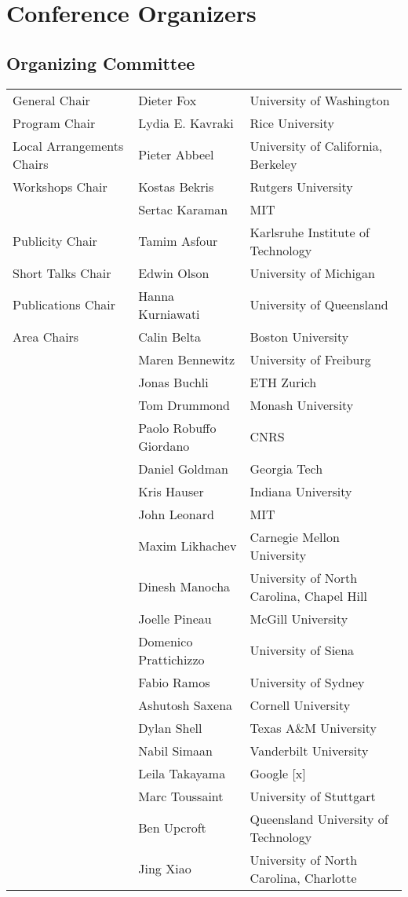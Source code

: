\chapter{Conference Organizers}

\vspace{-1.5cm}
\section{Organizing Committee}

\begin{tabular}{>{\raggedleft}p{5cm}p{4.5cm}>{\small}p{7cm}}
General Chair & Dieter Fox & University of Washington\\
Program Chair & Lydia E. Kavraki & Rice University\\
Local Arrangements Chairs & Pieter Abbeel & University of California, Berkeley\\
Workshops Chair & Kostas Bekris & Rutgers University\\
& Sertac Karaman & MIT\\
Publicity Chair & Tamim Asfour & Karlsruhe Institute of Technology\\
Short Talks Chair & Edwin Olson & University of Michigan\\
Publications Chair & Hanna Kurniawati & University of Queensland\\[5mm]

Area Chairs & Calin Belta & Boston University\\
& Maren Bennewitz & University of Freiburg\\
& Jonas Buchli & ETH Zurich\\
& Tom Drummond & Monash University\\
& Paolo Robuffo Giordano & CNRS \\
& Daniel Goldman & Georgia Tech \\
& Kris Hauser & Indiana University \\
& John Leonard & MIT \\
& Maxim Likhachev & Carnegie Mellon University \\
& Dinesh Manocha & University of North Carolina, Chapel Hill\\
& Joelle Pineau & McGill University \\
& Domenico Prattichizzo & University of Siena \\
& Fabio Ramos & University of Sydney \\
& Ashutosh Saxena & Cornell University \\
& Dylan Shell & Texas A\&M University \\
& Nabil Simaan & Vanderbilt University \\
& Leila Takayama & Google [x] \\
& Marc Toussaint & University of Stuttgart \\
& Ben Upcroft & Queensland University of Technology \\
& Jing Xiao & University of North Carolina, Charlotte\\[5mm]


\end{tabular}
